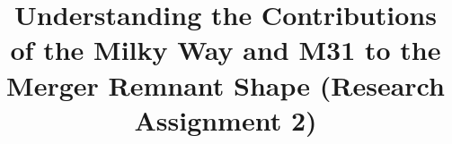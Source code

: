 \documentclass[linenumbers,trackchanges]{aastex7}
\begin{document}
\title{Understanding the Contributions of the Milky Way and M31 to the Merger Remnant Shape (Research Assignment 2)}

\end{document}
